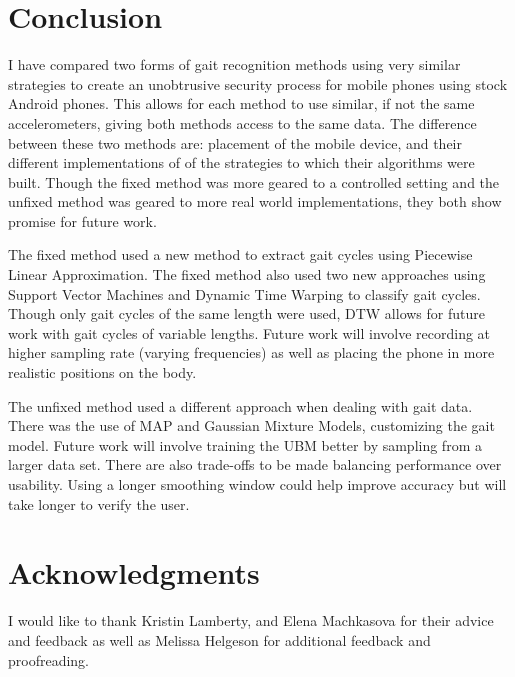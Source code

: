 \documentclass{sig-alternate}
\begin{document}

	
\section{Conclusion}
	I have compared two forms of gait recognition methods using very similar strategies to create an unobtrusive security process for mobile phones using stock Android phones. This allows for each method to use similar, if not the same accelerometers, giving both methods access to the same data. The difference between these two methods are: placement of the mobile device, and their different implementations of of the strategies to which their algorithms were built. Though the fixed method was more geared to a controlled setting and the unfixed method was geared to more real world implementations, they both show promise for future work. 
	
	The fixed method used a new method to extract gait cycles using Piecewise Linear Approximation. The fixed method also used two new approaches using Support Vector Machines and Dynamic Time Warping to classify gait cycles. Though only gait cycles of the same length were used, DTW allows for future work with gait cycles of variable lengths. Future work will involve recording at higher sampling rate (varying frequencies) as well as placing the phone in more realistic positions on the body.
		
		The unfixed method used a different approach when dealing with gait data. There was the use of MAP and Gaussian Mixture Models, customizing the gait model. Future work will involve training the UBM better by sampling from a larger data set. There are also trade-offs to be made balancing performance over usability. Using a longer smoothing window could help improve accuracy but will take longer to verify the user.

\section{Acknowledgments}
	I would like to thank Kristin Lamberty, and Elena Machkasova for their advice and feedback as well as Melissa Helgeson for additional feedback and proofreading. 

\end{document}
